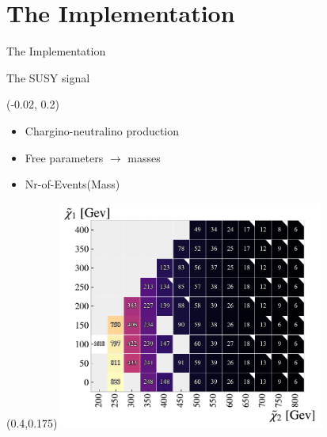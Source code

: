 \documentclass[UKenglish]{beamer}
\begin{document}
\section{The Implementation}
\begin{frame}{The Implementation}
    \tableofcontents[currentsection]
\end{frame}

\begin{frame}{The SUSY signal}
    \begin{textblock}{0.4}(-0.02, 0.2)
        \begin{itemize}
            \item Chargino-neutralino production
            \item Free parameters $\rightarrow$ masses 
            \item Nr-of-Events(Mass)
        \end{itemize}
    \end{textblock}
    \begin{textblock}{.9}(0.4,0.175)
        \includegraphics[width=0.65\textwidth]{figures/Signal/NrSignalEvents.pdf}
    \end{textblock}
\end{frame}
\end{document}
